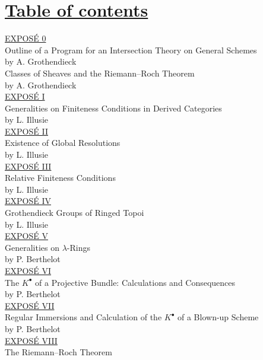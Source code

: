 %
%
\section*{\underline{Table of contents}}

\noindent
\underline{EXPOSÉ 0}\\
Outline of a Program for an Intersection Theory on General Schemes\\
by A. Grothendieck \\[8pt]
Classes of Sheaves and the Riemann--Roch Theorem\\
by A. Grothendieck \\[8pt]
\underline{EXPOSÉ I}\\
Generalities on Finiteness Conditions in Derived Categories\\
by L. Illusie \\[8pt]
\underline{EXPOSÉ II}\\
Existence of Global Resolutions\\
by L. Illusie \\[8pt]
\underline{EXPOSÉ III}\\
Relative Finiteness Conditions\\
by L. Illusie \\[8pt]
\underline{EXPOSÉ IV}\\
Grothendieck Groups of Ringed Topoi\\
by L. Illusie \\[8pt]
\underline{EXPOSÉ V}\\
Generalities on $\lambda$-Rings\\
by P. Berthelot \\[8pt]
\underline{EXPOSÉ VI}\\
The $K^{\bullet}$ of a Projective Bundle: Calculations and Consequences\\
by P. Berthelot \\[8pt]
%
\underline{EXPOSÉ VII}\\
Regular Immersions and Calculation of the $K^{\bullet}$ of a Blown-up Scheme\\
by P. Berthelot \\[8pt]
\underline{EXPOSÉ VIII}\\
The Riemann--Roch Theorem\\
